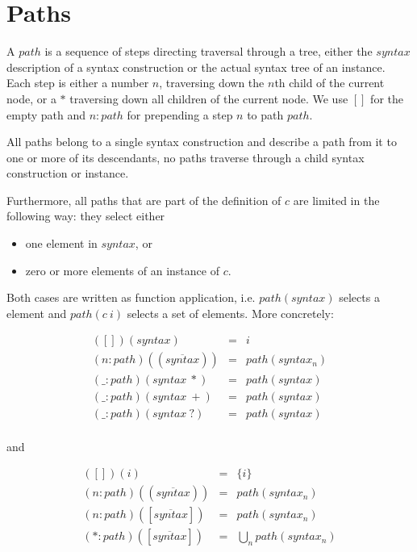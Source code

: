 \documentclass{kththesis}
\begin{document}

\section{Paths} \label{sec:paths}

A $path$ is a sequence of steps directing traversal through a tree, either the $syntax$ description of a syntax construction or the actual syntax tree of an instance. Each step is either a number $n$, traversing down the $n$th child of the current node, or a $*$ traversing down all children of the current node. We use $[]$ for the empty path and $n:path$ for prepending a step $n$ to path $path$.

All paths belong to a single syntax construction and describe a path from it to one or more of its descendants, no paths traverse through a child syntax construction or instance.

Furthermore, all paths that are part of the definition of $c$ are limited in the following way: they select either
\begin{itemize}
  \item one  element in $syntax$, or
  \item zero or more  elements of an instance of $c$.
\end{itemize}
Both cases are written as function application, i.e. $path(syntax)$ selects a  element and $path(c~i)$ selects a set of  elements. More concretely:

$$
\begin{array}{rcl}
([])(syntax) & = & i \\
(n : path)((\overline{syntax})) & = & path(syntax_n) \\
(\_ : path)(syntax~*) & = & path(syntax) \\
(\_ : path)(syntax~+) & = & path(syntax) \\
(\_ : path)(syntax~?) & = & path(syntax) \\
\end{array}
$$

and

$$
\begin{array}{rcl}
([])(i) & = & \{i\} \\
(n : path)((\overline{syntax})) & = & path(syntax_n) \\
(n : path)([\overline{syntax}]) & = & path(syntax_n) \\
(* : path)([\overline{syntax}]) & = & \bigcup_n path(syntax_n) \\
\end{array}
$$
\end{document}
